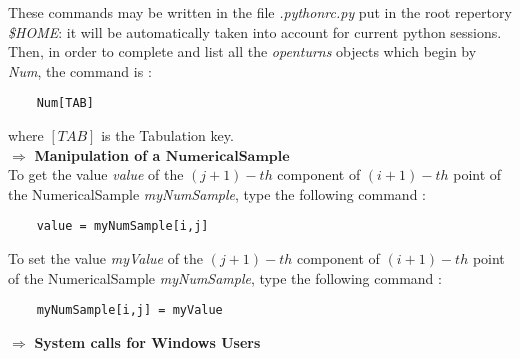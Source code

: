 These commands may be written in the file {\itshape .pythonrc.py} put in the root repertory {\itshape \$HOME}: it will be automatically taken into account  for current python sessions.\\
Then, in order to complete and list all the {\itshape openturns} objects which begin by {\itshape Num}, the command is :
\begin{center}
  \begin{lstlisting}
    Num[TAB]
  \end{lstlisting}
\end{center}

where $[TAB]$ is the Tabulation key.\\


$\boldsymbol{\Longrightarrow}$ {\bf Manipulation of a $\boldsymbol{NumericalSample}$}\\

To get the value \textit{value} of the  $(j+1)-th$ component of $(i+1)-th$ point of the NumericalSample \textit{myNumSample}, type the following command :

\begin{center}
  \begin{lstlisting}
    value = myNumSample[i,j]
  \end{lstlisting}
\end{center}

To set the value \textit{myValue} of the  $(j+1)-th$ component of $(i+1)-th$ point of the NumericalSample \textit{myNumSample}, type the following command :

\begin{center}
  \begin{lstlisting}
    myNumSample[i,j] = myValue
  \end{lstlisting}
\end{center}

$\boldsymbol{\Longrightarrow}$ {\bf System calls for Windows Users}

